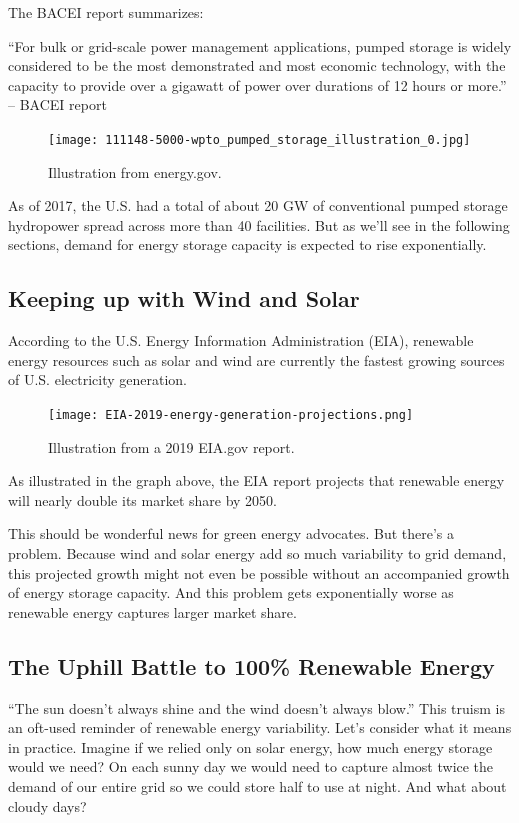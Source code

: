 \documentclass[hidelinks,12pt,a4paper]{article}
\begin{document}
The BACEI report summarizes:

\begin{displayquote}
“For bulk or grid-scale power management applications, pumped storage is widely considered to be the most demonstrated and most economic technology, with the capacity to provide over a gigawatt of power over durations of 12 hours or more.” \cite{EnergyStorageCaliforniaClimateandEnergyGoals} -- BACEI report
\end{displayquote}

\begin{figure}[ht!]
    \centering
    \texttt{[image: 111148-5000-wpto\_pumped\_storage\_illustration\_0.jpg]}
    \caption{Illustration from energy.gov. \cite{EnergyGovPumpedStorageHydropower}}
\end{figure}
\FloatBarrier

As of 2017, the U.S. had a total of about 20 GW of conventional pumped storage hydropower spread across more than 40 facilities. \cite{EnergyStorageCaliforniaClimateandEnergyGoals} But as we'll see in the following sections, demand for energy storage capacity is expected to rise exponentially.


\subsection{Keeping up with Wind and Solar}
According to the U.S. Energy Information Administration (EIA), renewable energy resources such as solar and wind are currently the fastest growing sources of U.S. electricity generation. \cite{EIAForecastsRenewables}

\begin{figure}[ht!]
    \centering
    \texttt{[image: EIA-2019-energy-generation-projections.png]}
    \caption{Illustration from a 2019 EIA.gov report. \cite{EIAForecastsRenewables}}
\end{figure}
\FloatBarrier

As illustrated in the graph above, the EIA report projects that renewable energy will nearly double its market share by 2050.

This should be wonderful news for green energy advocates. But there's a problem. Because wind and solar energy add so much variability to grid demand, this projected growth might not even be possible without an accompanied growth of energy storage capacity. And this problem gets exponentially worse as renewable energy captures larger market share.

\subsection{The Uphill Battle to 100\% Renewable Energy}
“The sun doesn’t always shine and the wind doesn’t always blow.” This truism is an oft-used reminder of renewable energy variability. Let's consider what it means in practice. Imagine if we relied only on solar energy, how much energy storage would we need? On each sunny day we would need to capture almost twice the demand of our entire grid so we could store half to use at night. And what about cloudy days?
\end{document}
